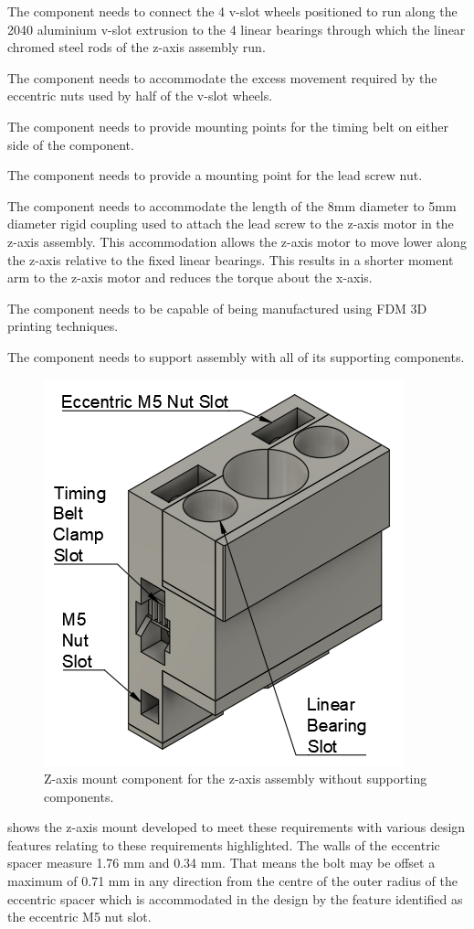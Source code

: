 \begin{compactitem}
	\item The component needs to connect the 4 v-slot wheels positioned to run along the 2040 aluminium v-slot extrusion to the 4 linear bearings through which the linear chromed steel rods of the z-axis assembly run.
	\item The component needs to accommodate the excess movement required by the eccentric nuts used by half of the v-slot wheels.
	\item The component needs to provide mounting points for the timing belt on either side of the component.
	\item The component needs to provide a mounting point for the lead screw nut.
	\item The component needs to accommodate the length of the 8mm diameter to 5mm diameter rigid coupling used to attach the lead screw to the z-axis motor in the z-axis assembly. This accommodation allows the z-axis motor to move lower along the z-axis relative to the fixed linear bearings. This results in a shorter moment arm to the z-axis motor and reduces the torque about the x-axis.
	\item The component needs to be capable of being manufactured using \ac{FDM} 3D printing techniques.
	\item The component needs to support assembly with all of its supporting components.
\end{compactitem}

\begin{figure}[H]
	\centering
	\includegraphics[width=0.35\linewidth]{figures/202108/z-axis-mount.png}
	\caption{Z-axis mount component for the z-axis assembly without supporting components.}
	\label{fig:z-axis-mount}
\end{figure}

 shows the z-axis mount developed to meet these requirements with various design features relating to these requirements highlighted. The walls of the eccentric spacer measure 1.76 mm and 0.34 mm. That means the bolt may be offset a maximum of 0.71 mm in any direction from the centre of the outer radius of the eccentric spacer which is accommodated in the design by the feature identified as the eccentric M5 nut slot.

